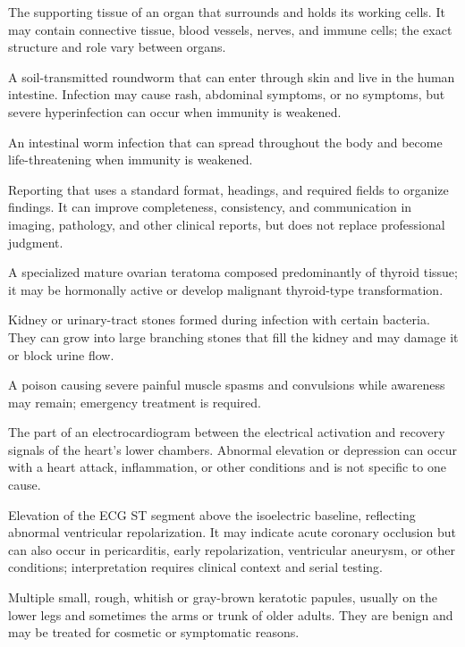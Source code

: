  The supporting tissue of an organ that surrounds and holds its working cells. It may contain connective tissue, blood vessels, nerves, and immune cells; the exact structure and role vary between organs.

 A soil-transmitted roundworm that can enter through skin and live in the human intestine. Infection may cause rash, abdominal symptoms, or no symptoms, but severe hyperinfection can occur when immunity is weakened.

 An intestinal worm infection that can spread throughout the body and become life-threatening when immunity is weakened.

 Reporting that uses a standard format, headings, and required fields to organize findings. It can improve completeness, consistency, and communication in imaging, pathology, and other clinical reports, but does not replace professional judgment.

 A specialized mature ovarian teratoma composed predominantly of thyroid tissue; it may be hormonally active or develop malignant thyroid-type transformation.

 Kidney or urinary-tract stones formed during infection with certain bacteria. They can grow into large branching stones that fill the kidney and may damage it or block urine flow.

 A poison causing severe painful muscle spasms and convulsions while awareness may remain; emergency treatment is required.

 The part of an electrocardiogram between the electrical activation and recovery signals of the heart's lower chambers. Abnormal elevation or depression can occur with a heart attack, inflammation, or other conditions and is not specific to one cause.

 Elevation of the ECG ST segment above the isoelectric baseline, reflecting abnormal
ventricular repolarization. It may indicate acute coronary occlusion but can also occur
in pericarditis, early repolarization, ventricular aneurysm, or other conditions;
interpretation requires clinical context and serial testing.

 Multiple small, rough, whitish or gray-brown keratotic papules, usually on the lower legs and sometimes the arms or trunk of older adults. They are benign and may be treated for cosmetic or symptomatic reasons.

